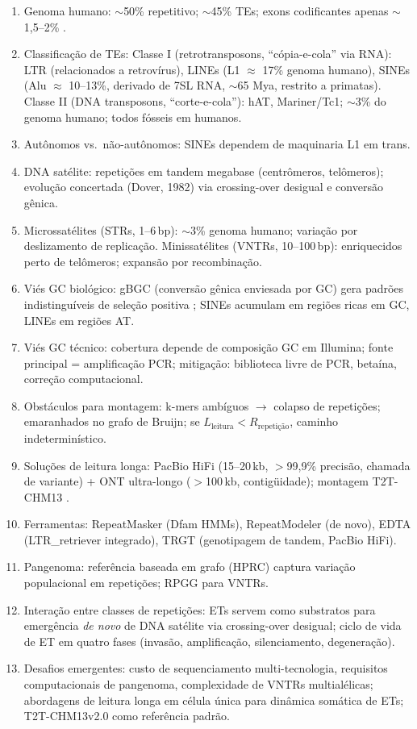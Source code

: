 \clearpage
\begin{revise}\small
\begin{enumerate}[itemsep=0pt, topsep=0pt, parsep=0pt]
    \item Genoma humano: $\sim$50\% repetitivo; $\sim$45\% TEs; exons codificantes apenas $\sim$1,5--2\% \parencite{lander2001,dekonig2011}.
    \item Classificação de TEs: Classe I (retrotransposons, ``cópia-e-cola'' via RNA): LTR (relacionados a retrovírus), LINEs (L1 $\approx$ 17\% genoma humano), SINEs (Alu $\approx$ 10--13\%, derivado de 7SL RNA, $\sim$65 Mya, restrito a primatas). Classe II (DNA transposons, ``corte-e-cola''): hAT, Mariner/Tc1; $\sim$3\% do genoma humano; todos fósseis em humanos.
    \item Autônomos vs.\ não-autônomos: SINEs dependem de maquinaria L1 em trans.
    \item DNA satélite: repetições em tandem megabase (centrômeros, telômeros); evolução concertada (Dover, 1982) via crossing-over desigual e conversão gênica.
    \item Microssatélites (STRs, 1--6\,bp): $\sim$3\% genoma humano; variação por deslizamento de replicação. Minissatélites (VNTRs, 10--100\,bp): enriquecidos perto de telômeros; expansão por recombinação.
    \item Viés GC biológico: gBGC (conversão gênica enviesada por GC) gera padrões indistinguíveis de seleção positiva \parencite{galtier2001}; SINEs acumulam em regiões ricas em GC, LINEs em regiões AT.
    \item Viés GC técnico: cobertura depende de composição GC em Illumina; fonte principal = amplificação PCR; mitigação: biblioteca livre de PCR, betaína, correção computacional.
    \item Obstáculos para montagem: k-mers ambíguos $\to$ colapso de repetições; emaranhados no grafo de Bruijn; se $L_{\text{leitura}} < R_{\text{repetição}}$, caminho indeterminístico.
    \item Soluções de leitura longa: PacBio HiFi (15--20\,kb, $>$99,9\% precisão, chamada de variante) + ONT ultra-longo ($>$100\,kb, contigüidade); montagem T2T-CHM13 \parencite{nurk2022}.
    \item Ferramentas: RepeatMasker (Dfam HMMs), RepeatModeler (de novo), EDTA (LTR\_retriever integrado), TRGT (genotipagem de tandem, PacBio HiFi).
    \item Pangenoma: referência baseada em grafo (HPRC) captura variação populacional em repetições; RPGG para VNTRs.
    \item Interação entre classes de repetições: ETs servem como substratos para emergência \textit{de novo} de DNA satélite via crossing-over desigual; ciclo de vida de ET em quatro fases (invasão, amplificação, silenciamento, degeneração).
    \item Desafios emergentes: custo de sequenciamento multi-tecnologia, requisitos computacionais de pangenoma, complexidade de VNTRs multialélicas; abordagens de leitura longa em célula única para dinâmica somática de ETs; T2T-CHM13v2.0 como referência padrão.
\end{enumerate}
\end{revise}

\clearpage

\printbibliography[heading=subbibliography,title={Referências}]

